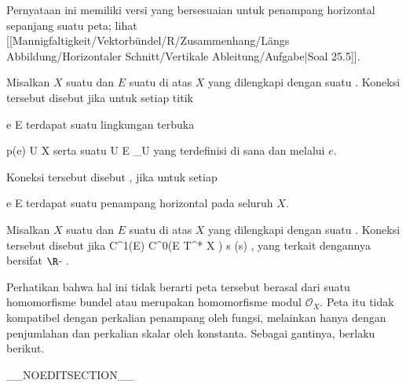 Pernyataan ini memiliki versi yang bersesuaian untuk penampang horizontal sepanjang suatu peta; lihat
[[Mannigfaltigkeit/Vektorbündel/R/Zusammenhang/Längs Abbildung/Horizontaler Schnitt/Vertikale Ableitung/Aufgabe|Soal 25.5]].

{}
{

Misalkan $X$ suatu
dan $E$ suatu
di atas $X$ yang dilengkapi dengan suatu
.
Koneksi tersebut disebut
jika untuk setiap titik

\mavergleichskette
{\vergleichskette
{ e
}
{ \in }{ E
}
{  }{
}
{    }{
}
{   }{
}
}
{}{}{}
terdapat suatu lingkungan terbuka

\mavergleichskette
{\vergleichskette
{ p(e)
}
{ \in }{ U
}
{ \subseteq }{ X
}
{    }{
}
{   }{
}
}
{}{}{}
serta suatu
 { U } { E  \vert_U
} {}
yang terdefinisi di sana dan melalui $e$.

}
Koneksi tersebut disebut  {,} jika untuk setiap

\mavergleichskette
{\vergleichskette
{ e
}
{ \in }{ E
}
{  }{
}
{    }{
}
{   }{
}
}
{}{}{}
terdapat suatu penampang horizontal pada seluruh $X$.


{}
{

Misalkan $X$ suatu
dan $E$ suatu
di atas $X$ yang dilengkapi dengan suatu
.
Koneksi tersebut disebut
jika
\maabbeledisp {\nabla} {C^1(E)} { C^0(E \otimes T^* X )
} { s } { \nabla(s)
} {,}
yang terkait dengannya bersifat
$\R$-
 {} {.}

}

Perhatikan bahwa hal ini tidak berarti peta tersebut berasal dari suatu homomorfisme bundel atau merupakan homomorfisme modul ${\mathcal O}_X$. Peta itu tidak kompatibel dengan perkalian penampang oleh fungsi, melainkan hanya dengan penjumlahan dan perkalian skalar oleh konstanta. Sebagai gantinya, berlaku  {} berikut.

__NOEDITSECTION__

